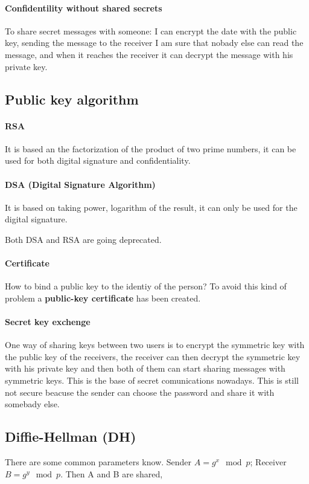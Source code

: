 \documentclass[12pt]{article}
\begin{document}
\paragraph{Confidentility without shared secrets}
To share secret messages with someone: I can encrypt the date with the public key, sending the message to the receiver I am sure that nobady else can read the message, and when it reaches the receiver it can decrypt the message with his private key.

\subsection{Public key algorithm}
\paragraph{RSA} 
It is based an the factorization of the product of two prime numbers, it can be used for both digital signature and confidentiality.

\paragraph{DSA (Digital Signature Algorithm)}
It is based on taking power, logarithm of the result, it can only be used for the digital signature.

Both DSA and RSA are going deprecated.

\paragraph{Certificate}
How to bind a public key to the identiy of the person? To avoid this kind of problem a \textbf{public-key certificate} has been created.

\paragraph{Secret key exchenge}
One way of sharing keys between two users is to encrypt the symmetric key with the public key of the receivers, the receiver can then decrypt the symmetric key  with his private key and then both of them can start sharing messages with symmetric keys. This is the base of secret comunications nowadays. This is still not secure beacuse the sender can choose the password and share it with somebady else.

\subsection{Diffie-Hellman (DH)}
There are some common parameters know.
Sender $A = g^{x} \mod p$; Receiver $B = g^{y} \mod p$. Then A and B are shared,
\end{document}
